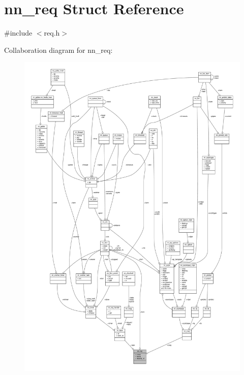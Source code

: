 \hypertarget{structnn__req}{}\section{nn\+\_\+req Struct Reference}
\label{structnn__req}


{\ttfamily \#include $<$req.\+h$>$}



Collaboration diagram for nn\+\_\+req\+:\nopagebreak
\begin{figure}[H]
\begin{center}
\leavevmode
\includegraphics[width=350pt]{structnn__req__coll__graph}
\end{center}
\end{figure}
